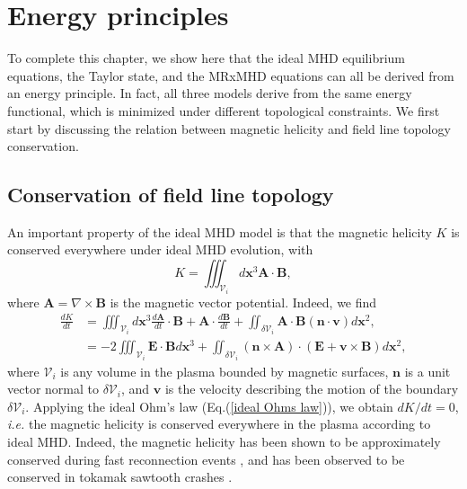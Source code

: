 \documentclass[my_thesis.tex]{subfiles}
\begin{document}
\section{Energy principles}\label{sec.energy principle}
To complete this chapter, we show here that the ideal MHD equilibrium equations, the Taylor state, and the MRxMHD equations can all be derived from an energy principle. In fact, all three models derive from the same energy functional, which is minimized under different topological constraints. We first start by discussing the relation between magnetic helicity and field line topology conservation.

\subsection{Conservation of field line topology}
An important property of the ideal MHD model is that the magnetic helicity $K$ is conserved everywhere under ideal MHD evolution, with
\begin{equation}
	K = \iiint_{\mathcal{V}_i} d\mathbf{x}^3 \mathbf{A} \cdot \mathbf{B},
\end{equation}
where $\mathbf{A}=\nabla\times\mathbf{B}$ is the magnetic vector potential. Indeed, we find
\begin{align}
	\frac{dK}{dt} &= \iiint_{\mathcal{V}_i} d\mathbf{x}^3 \frac{d\mathbf{A}}{dt}\cdot\mathbf{B} + \mathbf{A}\cdot\frac{d\mathbf{B}}{dt} + \iint_{\delta\mathcal{V}_i} \mathbf{A}\cdot\mathbf{B}(\mathbf{n}\cdot\mathbf{v})d\mathbf{x}^2, \\
	&= -2\iiint_{\mathcal{V}_i}\mathbf{E}\cdot\mathbf{B} d\mathbf{x}^3 + \iint_{\delta\mathcal{V}_i}(\mathbf{n}\times\mathbf{A})\cdot(\mathbf{E}+\mathbf{v}\times\mathbf{B})d\mathbf{x}^2,
\end{align}
where $\mathcal{V}_i$ is any volume in the plasma bounded by magnetic surfaces, $\mathbf{n}$ is a unit vector normal to $\delta \mathcal{V}_i$, and $\mathbf{v}$ is the velocity describing the motion of the boundary $\delta\mathcal{V}_i$. Applying the ideal Ohm's law (Eq.(\ref{ideal Ohms law})), we obtain $dK/dt = 0$, \textit{i.e.} the magnetic helicity is conserved everywhere in the plasma according to ideal MHD. Indeed, the magnetic helicity has been shown to be approximately conserved during fast reconnection events \citep{bergerIntroductionMagneticHelicity1999}, and has been observed to be conserved in tokamak sawtooth crashes \citep{Heidbrink2000}. 
\end{document}

